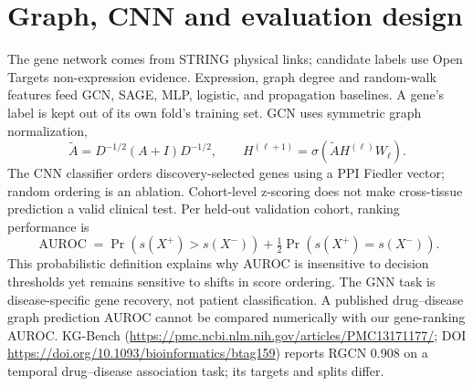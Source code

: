 \documentclass[11pt,a4paper]{article}
\begin{document}
\section{Graph, CNN and evaluation design}
The gene network comes from STRING physical links; candidate labels use Open Targets non-expression evidence. Expression, graph degree and random-walk features feed GCN, SAGE, MLP, logistic, and propagation baselines. A gene's label is kept out of its own fold's training set. GCN uses symmetric graph normalization,
\begin{equation}\tilde A=D^{-1/2}(A+I)D^{-1/2},\qquad H^{(\ell+1)}=\sigma(\tilde A H^{(\ell)}W_\ell).\end{equation}
The CNN classifier orders discovery-selected genes using a PPI Fiedler vector; random ordering is an ablation. Cohort-level z-scoring does not make cross-tissue prediction a valid clinical test. Per held-out validation cohort, ranking performance is
\begin{equation}\operatorname{AUROC}=\Pr(s(X^+)>s(X^-)) + \tfrac12\Pr(s(X^+)=s(X^-)).\end{equation}
This probabilistic definition explains why AUROC is insensitive to decision thresholds yet remains sensitive to shifts in score ordering. The GNN task is disease-specific gene recovery, not patient classification. A published drug--disease graph prediction AUROC cannot be compared numerically with our gene-ranking AUROC. KG-Bench (\url{https://pmc.ncbi.nlm.nih.gov/articles/PMC13171177/}; DOI \url{https://doi.org/10.1093/bioinformatics/btag159}) reports RGCN 0.908 on a temporal drug--disease association task; its targets and splits differ.
\end{document}
